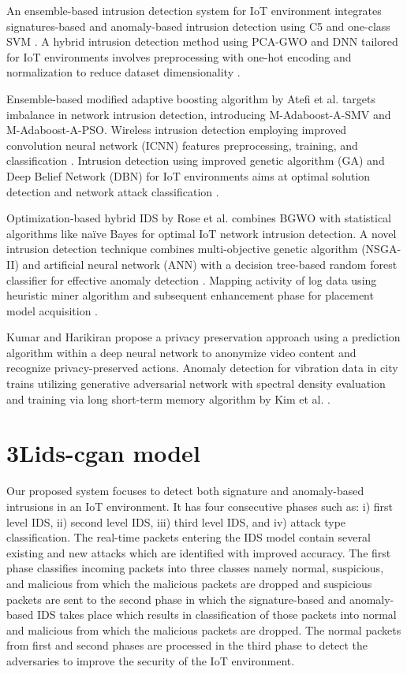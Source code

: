 \documentclass[conference]{IEEEtran}
\begin{document}
An ensemble-based intrusion detection system for IoT environment integrates signatures-based and anomaly-based intrusion detection using C5 and one-class SVM \cite{32}. A hybrid intrusion detection method using PCA-GWO and DNN tailored for IoT environments involves preprocessing with one-hot encoding and normalization to reduce dataset dimensionality \cite{33}. 

Ensemble-based modified adaptive boosting algorithm by Atefi et al. \cite{34} targets imbalance in network intrusion detection, introducing M-Adaboost-A-SMV and M-Adaboost-A-PSO. Wireless intrusion detection employing improved convolution neural network (ICNN) features preprocessing, training, and classification \cite{35}. Intrusion detection using improved genetic algorithm (GA) and Deep Belief Network (DBN) for IoT environments aims at optimal solution detection and network attack classification \cite{36}. 

Optimization-based hybrid IDS by Rose et al. \cite{37} combines BGWO with statistical algorithms like naïve Bayes for optimal IoT network intrusion detection. A novel intrusion detection technique combines multi-objective genetic algorithm (NSGA-II) and artificial neural network (ANN) with a decision tree-based random forest classifier for effective anomaly detection \cite{38}.  Mapping activity of log data using heuristic miner algorithm and subsequent enhancement phase for placement model acquisition \cite{39}.  

Kumar and Harikiran \cite{40} propose a privacy preservation approach using a prediction algorithm within a deep neural network to anonymize video content and recognize privacy-preserved actions. Anomaly detection for vibration data in city trains utilizing generative adversarial network with spectral density evaluation and training via long short-term memory algorithm by Kim et al. \cite{41}.

\section{3Lids-cgan model}
Our proposed system focuses to detect both signature and anomaly-based intrusions in an IoT
environment. It has four consecutive phases such as: i) first level IDS, ii) second level IDS, iii) third level
IDS, and iv) attack type classification. The real-time packets entering the IDS model contain several existing
and new attacks which are identified with improved accuracy. The first phase classifies incoming packets
into three classes namely normal, suspicious, and malicious from which the malicious packets are dropped
and suspicious packets are sent to the second phase in which the signature-based and anomaly-based IDS
takes place which results in classification of those packets into normal and malicious from which the
malicious packets are dropped. The normal packets from first and second phases are processed in the third
phase to detect the adversaries to improve the security of the IoT environment.
\end{document}
